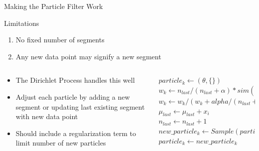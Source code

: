 \documentclass[compress]{beamer}
\begin{document}
\begin{frame}{Making the Particle Filter Work}

\begin{block}{Limitations}
\begin{enumerate}
\item No fixed number of segments
\item Any new data point may signify a new segment
\end{enumerate}
\end{block}

\pause

\begin{columns}
\begin{column}[1]{5cm}

\begin{itemize}
\item The Dirichlet Process handles this well
\item Adjust each particle by adding a new segment or updating last existing
segment with new data point
\item Should include a regularization term to limit number of new particles
\end{itemize}
\end{column}

\begin{column}[2]{5cm}

\tiny{
\begin{algorithm}[H]
$particle_k \leftarrow (\theta, \{\})$ \\
 {
     {
        $w_k \leftarrow n_{last} / (n_{last}+\alpha) * sim(x_i, \mu_{last})$ \\
        $w_k \leftarrow w_k / (w_k + alpha / (n_{last} + \alpha))$ \\
         {
            $\mu_{last} \leftarrow \mu_{last} + x_i$
            $n_{last} \leftarrow n_{last} + 1$
        } 
    }
    $new\_particle_k \leftarrow Sample(particle)$ \\
    $particle_k \leftarrow new\_particle_k$ \\
}
\end{algorithm}
}
\end{column}
\end{columns}
\end{frame}
\end{document}
